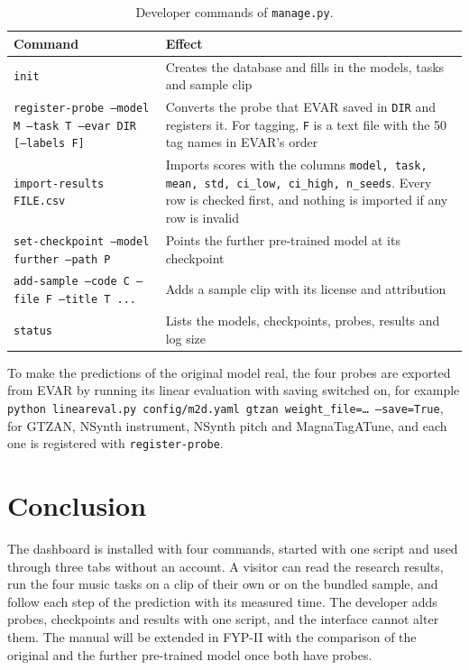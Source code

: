 \begin{table}[htbp]
\centering
\caption[Developer commands]{Developer commands of \texttt{manage.py}.}
\label{tab:man-commands}
\small\singlespacing
\begin{tabularx}{\linewidth}{>{\raggedright\arraybackslash}p{6.3cm}Y}
\toprule
\textbf{Command} & \textbf{Effect}\\
\midrule
\texttt{init} & Creates the database and fills in the models, tasks and sample clip\\
\texttt{register-probe --model M --task T --evar DIR [--labels F]} & Converts the probe that EVAR saved in \texttt{DIR} and registers it. For tagging, \texttt{F} is a text file with the 50 tag names in EVAR's order\\
\texttt{import-results FILE.csv} & Imports scores with the columns \texttt{model, task, mean, std, ci\_low, ci\_high, n\_seeds}. Every row is checked first, and nothing is imported if any row is invalid\\
\texttt{set-checkpoint --model further --path P} & Points the further pre-trained model at its checkpoint\\
\texttt{add-sample --code C --file F --title T ...} & Adds a sample clip with its license and attribution\\
\texttt{status} & Lists the models, checkpoints, probes, results and log size\\
\bottomrule
\end{tabularx}
\end{table}

To make the predictions of the original model real, the four probes are exported from EVAR by running its linear evaluation with saving switched on, for example \texttt{python lineareval.py config/m2d.yaml gtzan weight\_file=\ldots\ --save=True}, for GTZAN, NSynth instrument, NSynth pitch and MagnaTagATune, and each one is registered with \texttt{register-probe}.

\section{Conclusion}
\label{sec:man-conclusion}
The dashboard is installed with four commands, started with one script and used through three tabs without an account. A visitor can read the research results, run the four music tasks on a clip of their own or on the bundled sample, and follow each step of the prediction with its measured time. The developer adds probes, checkpoints and results with one script, and the interface cannot alter them. The manual will be extended in FYP-II with the comparison of the original and the further pre-trained model once both have probes.

